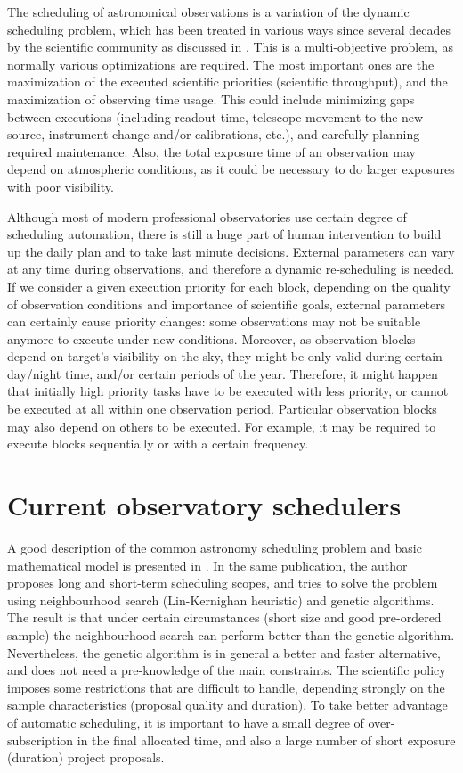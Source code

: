 The scheduling of astronomical observations is a variation of the dynamic scheduling problem, which has been treated in various ways since several decades by the scientific community as discussed in \cite{gomez03}. This is a multi-objective problem, as normally various optimizations are required. The most important ones are the maximization of the executed scientific priorities (scientific throughput), and the maximization of observing time usage. This could include minimizing gaps between executions (including readout time, telescope movement to the new source, instrument change and/or calibrations, etc.), and carefully planning required maintenance. Also, the total exposure time of an observation may depend on atmospheric conditions, as it could be necessary to do larger exposures with poor visibility.

Although most of modern professional observatories use certain degree of scheduling automation, there is still a huge part of human intervention to build up the daily plan and to take last minute decisions. External parameters can vary at any time during observations, and therefore a dynamic re-scheduling is needed. If we consider a given execution priority for each block, depending on the quality of observation conditions and importance of scientific goals, external parameters can certainly cause priority changes: some observations may not be suitable anymore to execute under new conditions. Moreover, as observation blocks depend on target’s visibility on the sky, they might be only valid during certain day/night time, and/or certain periods of the year. Therefore, it might happen that initially high priority tasks have to be executed with less priority, or cannot be executed at all within one observation period. Particular observation blocks may also depend on others to be executed. For example, it may be required to execute blocks sequentially or with a certain frequency.

\section{Current observatory schedulers}

A good description of the common astronomy scheduling problem and basic mathematical model is presented in \cite{gomez03}. In the same publication, the author proposes long and short-term scheduling scopes, and tries to solve the problem using neighbourhood search (Lin-Kernighan heuristic) and genetic algorithms. The result is that under certain circumstances (short size and good pre-ordered sample) the neighbourhood search can perform better than the genetic algorithm. Nevertheless, the genetic algorithm is in general a better and faster alternative, and does not need a pre-knowledge of the main constraints. The scientific policy imposes some restrictions that are difficult to handle, depending strongly on the sample characteristics (proposal quality and duration). To take better advantage of automatic scheduling, it is important to have a small degree of over-subscription in the final allocated time, and also a large number of short exposure (duration) project proposals.

